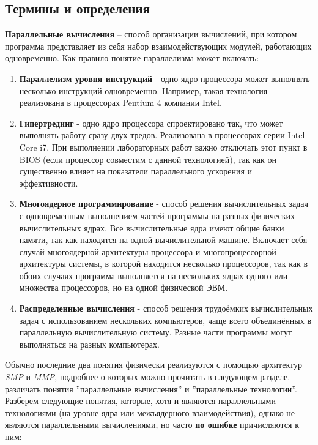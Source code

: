 { %
	\subsection{Термины и определения}
	\par\textbf{Параллельные вычисления} – 
способ организации вычислений, при котором программа представляет из себя набор взаимодействующих модулей, работающих одновременно. Как правило понятие параллелизма может включать:
		\begin{enumerate}
			\item\textbf{Параллелизм уровня инструкций} - одно ядро процессора может выполнять несколько инструкций одновременно. Например, такая технология реализована в процессорах Pentium 4 компании Intel.
			\item\textbf{Гипертрединг} - одно ядро процессора спроектировано так, что может выполнять работу сразу двух тредов. Реализована в процессорах серии Intel Core i7. При выполнении лабораторных работ важно отключать этот пункт в BIOS (если процессор совместим с данной технологией), так как он существенно влияет на показатели параллельного ускорения и эффективности.
			\item\textbf{Многоядерное программирование} -  способ решения вычислительных задач с одновременным выполнением частей программы на разных физических вычислительных ядрах. Все вычислительные ядра имеют общие банки памяти, так как находятся на одной вычислительной машине. Включает себя случай многоядерной архитектуры процессора и многопроцессорной архитектуры системы, в которой находится несколько процессоров, так как в обоих случаях программа выполняется на нескольких ядрах одного или множества процессоров, но на одной физической ЭВМ.
			\item\textbf{Распределенные вычисления} - способ решения трудоёмких вычислительных задач с использованием нескольких компьютеров, чаще всего объединённых в параллельную вычислительную систему. Разные части программы могут выполняться на разных компьютерах.
		\end{enumerate}
	Обычно последние два понятия физически реализуются с помощью архитектур \textit{SMP} и \textit{MMP}, подробнее о которых можно прочитать в следующем разделе.
	 различать понятия ''параллельные вычисления'' и ''параллельные технологии''. Разберем следующие понятия, которые, хотя и являются параллельными технологиями (на уровне ядра или межъядерного взаимодействия), однако не являются параллельными вычислениями, но часто \textbf{по ошибке} причисляются к ним:
		\begin{itemize}

\end{itemize}}
